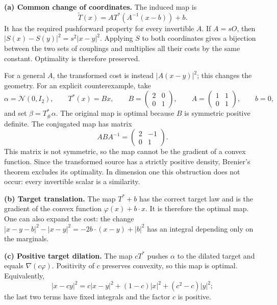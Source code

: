 \documentclass[11pt,a4paper]{article}
\theoremstyle{exostyle}
\newcommand{\push}{\#}
\newcommand{\Gauss}{\mathcal{N}}
\begin{document}
\begin{solution}
\textbf{(a) Common change of coordinates.}
The induced map is
\[
  \widetilde T(x)=A T^*(A^{-1}(x-b))+b.
\]
It has the required pushforward property for every invertible $A$.
If $A=sO$, then $|S(x)-S(y)|^2=s^2|x-y|^2$. Applying $S$ to both
coordinates gives a bijection between the two sets of couplings and
multiplies all their costs by the same constant. Optimality is therefore
preserved.

For a general $A$, the transformed cost is instead $|A(x-y)|^2$;
this changes the geometry. For an explicit counterexample, take
\[
  \alpha=\Gauss(0,I_2),\qquad T^*(x)=Bx,\qquad
  B=\begin{pmatrix}2&0\\0&1\end{pmatrix},\qquad
  A=\begin{pmatrix}1&1\\0&1\end{pmatrix},\qquad b=0,
\]
and set $\beta=T^*_\push\alpha$. The original map is optimal because
$B$ is symmetric positive definite. The conjugated map has matrix
\[
  ABA^{-1}=\begin{pmatrix}2&-1\\0&1\end{pmatrix}.
\]
This matrix is not symmetric, so the map cannot be the gradient of a
convex function. Since the transformed source has a strictly positive
density, Brenier's theorem excludes its optimality. In dimension one
this obstruction does not occur: every invertible scalar is a similarity.

\textbf{(b) Target translation.}
The map $T^*+b$ has the correct target law and is the gradient of the
convex function $\varphi(x)+b\cdot x$. It is therefore the optimal map.
One can also expand the cost: the change
$|x-y-b|^2-|x-y|^2=-2b\cdot(x-y)+|b|^2$ has an integral depending
only on the marginals.

\textbf{(c) Positive target dilation.}
The map $cT^*$ pushes $\alpha$ to the dilated target and equals
$\nabla(c\varphi)$. Positivity of $c$ preserves convexity, so this map
is optimal. Equivalently,
\[
  |x-cy|^2=c|x-y|^2+(1-c)|x|^2+(c^2-c)|y|^2;
\]
the last two terms have fixed integrals and the factor $c$ is positive.
\end{solution}
\end{document}
